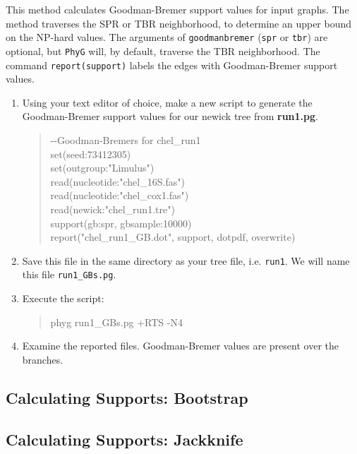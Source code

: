 \documentclass[]{article}
\newcommand{\phyg}{\texttt{PhyG} }
\begin{document}
This method calculates Goodman-Bremer support values for input graphs. The 
method traverses the SPR or TBR neighborhood, to determine an upper bound 
on the NP-hard values. The arguments of \texttt{goodmanbremer} (\texttt{spr} or 
\texttt{tbr}) are optional, but \phyg will, by default, traverse the TBR neighborhood. 
The command \texttt{report(support)} labels the edges with Goodman-Bremer support 
values.

\begin{enumerate}
 
 \item Using your text editor of choice, make a new script to generate the 
 Goodman-Bremer support values for our newick tree from \textbf{run1.pg}.
 
         \begin{quote}
	-\/-Goodman-Bremers for chel\_run1\\
	set(seed:73412305) \\
	set(outgroup:"Limulus") \\
	read(nucleotide:"chel\_16S.fas") \\
	read(nucleotide:"chel\_cox1.fas") \\
	read(newick:"chel\_run1.tre") \\
	support(gb:spr, gbsample:10000)\\
	report("chel\_run1\_GB.dot", support, dotpdf, overwrite)
        \end{quote}
       
\item Save this file in the same directory as your tree file, i.e. \texttt{run1}.
We will name this file \texttt{run1\_GBs.pg}.

\item Execute the script:

	\begin{quote}
  	phyg run1\_GBs.pg +RTS -N4
	\end{quote}
	
\item Examine the reported files. Goodman-Bremer values are present
over the branches.
         
\end{enumerate}

\subsection{Calculating Supports: Bootstrap}

\subsection{Calculating Supports: Jackknife}


\end{document}
